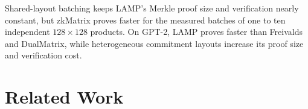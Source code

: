 \documentclass[conference,compsoc]{IEEEtran}
\makeatletter
\newif\ifshowrevisions
\newenvironment{revblock}[1][]
  {%
    \ifshowrevisions
      \begin{tcolorbox}[
        breakable,
        colback=revisionyellow,
        colframe=revisionyellow,
        boxrule=0pt,
        arc=0pt,
        left=2pt,
        right=2pt,
        top=2pt,
        bottom=2pt,
        before skip=2pt,
        after skip=2pt,
        #1
      ]
    \fi
  }
  {%
    \ifshowrevisions
      \end{tcolorbox}
    \fi
  }
\newcommand{\protocol}{\textsf{LAMP}}   %
\theoremstyle{plain}
\theoremstyle{definition}
\theoremstyle{remark}
\providecommand{\DIFaddtex}[1]{{\protect\color{blue}\uwave{#1}}} %
\providecommand{\DIFdeltex}[1]{{\protect\color{red}\sout{#1}}} %
\providecommand{\DIFaddbegin}{} %
\providecommand{\DIFaddend}{} %
\providecommand{\DIFdelbegin}{} %
\providecommand{\DIFdelend}{} %
\providecommand{\DIFadd}[1]{\texorpdfstring{\DIFaddtex{#1}}{#1}} %
\providecommand{\DIFdel}[1]{\texorpdfstring{\DIFdeltex{#1}}{}} %
\let\sout@orig\sout %
\renewcommand{\sout}[1]{\ifmmode\text{\sout@orig{\ensuremath{#1}}}\else\sout@orig{#1}\fi} %
\renewcommand{\DIFaddtex}[1]{{\protect\color{DiffBlue}#1}}
\renewcommand{\DIFdeltex}[1]{}
\makeatother
\begin{document}
\begin{itemize}
\begin{revblock}
  \DIFdelbegin \DIFdel{We further evaluate batching and a GPT-2 workload.
Batching matrix products
  with a shared leaf layout keeps the }\DIFdelend \DIFaddbegin \DIFadd{Shared-layout batching keeps LAMP's }\DIFaddend Merkle proof size and verification
  \DIFdelbegin \DIFdel{time
  nearly constantas the number of
  claims increases}\DIFdelend \DIFaddbegin \DIFadd{nearly constant, but zkMatrix proves faster for the measured batches of
  one to ten independent \(128\times128\) products}\DIFaddend . On GPT-2, \DIFdelbegin \DIFdel{\(\protocol\)
  }\DIFdelend \DIFaddbegin \DIFadd{LAMP }\DIFaddend proves
  faster than \DIFdelbegin \DIFdel{both the Freivalds baseline }\DIFdelend \DIFaddbegin \DIFadd{Freivalds }\DIFaddend and DualMatrix, \DIFdelbegin \DIFdel{although
  heterogeneous matrix dimensions require multiple commitment
  layouts and
  increase }\DIFdelend \DIFaddbegin \DIFadd{while heterogeneous commitment
  layouts increase its }\DIFaddend proof size and verification cost.
  \end{revblock}
\end{itemize}





\section{Related Work}
\label{sec:related}
\end{document}
